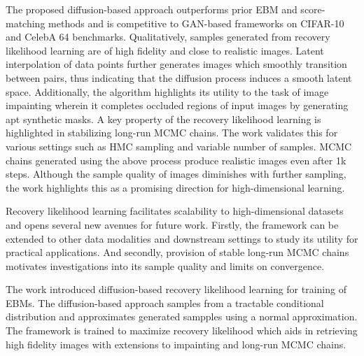 \documentclass[11pt,letterpaper]{article}
\begin{document}
The proposed diffusion-based approach outperforms prior EBM and score-matching methods and is competitive to GAN-based frameworks on CIFAR-10 and CelebA 64 benchmarks. Qualitatively, samples generated from recovery likelihood learning are of high fidelity and close to realistic images. Latent interpolation of data points further generates images which smoothly transition between pairs, thus indicating that the diffusion process induces a smooth latent space. Additionally, the algorithm highlights its utility to the task of image impainting wherein it completes occluded regions of input images by generating apt synthetic masks. A key property of the recovery likelihood learning is highlighted in stabilizing long-run MCMC chains. The work validates this for various settings such as HMC sampling and variable number of samples. MCMC chains generated using the above process produce realistic images even after 1k steps. Although the sample quality of images diminishes with further sampling, the work highlights this as a promising direction for high-dimensional learning. 

Recovery likelihood learning facilitates scalability to high-dimensional datasets and opens several new avenues for future work. Firstly, the framework can be extended to other data modalities and downstream settings to study its utility for practical applications. And secondly, provision of stable long-run MCMC chains motivates investigations into its sample quality and limits on convergence.

The work introduced diffusion-based recovery likelihood learning for training of EBMs. The diffusion-based approach samples from a tractable conditional distribution and approximates generated sampples using a normal approximation. The framework is trained to maximize recovery likelihood which aids in retrieving high fidelity images with extensions to impainting and long-run MCMC chains.
\end{document}
